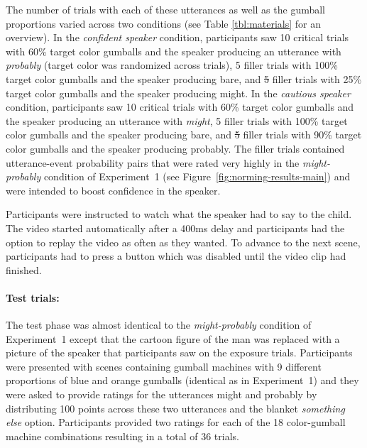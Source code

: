 \documentclass[man, floatsintext]{apa6}
\newcommand{\figref}[1]{Figure~\ref{#1}}
\providecommand{\DIFadd}[1]{{\protect\color{blue}\uwave{#1}}} %
\providecommand{\DIFdel}[1]{{\protect\color{red}\sout{#1}}}                      %
\providecommand{\DIFaddbegin}{} %
\providecommand{\DIFaddend}{} %
\providecommand{\DIFdelbegin}{} %
\providecommand{\DIFdelend}{} %
\newcommand{\DIFscaledelfig}{0.5}
\newlength{\DIFdelgraphicswidth} %
\newlength{\DIFdelgraphicsheight} %
\newcommand{\DIFaddincludegraphics}[2][]{{\color{blue}\fbox{\DIFOincludegraphics[#1]{#2}}}} %
\newcommand{\DIFdelincludegraphics}[2][]{%
\sbox{\DIFdelgraphicsbox}{\DIFOincludegraphics[#1]{#2}}%
\settoboxwidth{\DIFdelgraphicswidth}{\DIFdelgraphicsbox} %
\settoboxtotalheight{\DIFdelgraphicsheight}{\DIFdelgraphicsbox} %
\scalebox{\DIFscaledelfig}{%
\parbox[b]{\DIFdelgraphicswidth}{\usebox{\DIFdelgraphicsbox}\\[-\baselineskip] \rule{\DIFdelgraphicswidth}{0em}}\llap{\resizebox{\DIFdelgraphicswidth}{\DIFdelgraphicsheight}{%
\setlength{\unitlength}{\DIFdelgraphicswidth}%
\begin{picture}(1,1)%
\thicklines\linethickness{2pt} %
{\color[rgb]{1,0,0}\put(0,0){\framebox(1,1){}}}%
{\color[rgb]{1,0,0}\put(0,0){\line( 1,1){1}}}%
{\color[rgb]{1,0,0}\put(0,1){\line(1,-1){1}}}%
\end{picture}%
}\hspace*{3pt}}} %
} %
\DeclareRobustCommand{\DIFaddbegin}{\DIFOaddbegin \let\includegraphics\DIFaddincludegraphics} %
\DeclareRobustCommand{\DIFaddend}{\DIFOaddend \let\includegraphics\DIFOincludegraphics} %
\DeclareRobustCommand{\DIFdelbegin}{\DIFOdelbegin \let\includegraphics\DIFdelincludegraphics} %
\DeclareRobustCommand{\DIFdelend}{\DIFOaddend \let\includegraphics\DIFOincludegraphics} %
\begin{document}
The number of trials with each of these utterances as well as the gumball proportions varied across two conditions (see Table \ref{tbl:materials} for an overview). In the {\it confident speaker} condition, participants saw 10 critical trials with 60\% target color gumballs and the speaker producing an utterance with \emph{probably} (target color was randomized across trials), 5 filler trials with 100\% target color gumballs and the speaker producing {\sc bare}, and \DIFdelbegin \DIFdel{5 }\DIFdelend \DIFaddbegin \DIFadd{10 }\DIFaddend filler trials with 25\% target color gumballs and the speaker producing {\sc might}. In the {\it cautious speaker} condition, participants saw 10 critical trials with 60\% target color gumballs and the speaker producing an utterance with \emph{might}, 5 filler trials with 100\% target color gumballs and the speaker producing {\sc bare}, and \DIFdelbegin \DIFdel{5 }\DIFdelend \DIFaddbegin \DIFadd{10 }\DIFaddend filler trials with 90\% target color gumballs and the speaker producing {\sc probably}. The filler trials contained utterance-event probability pairs that were rated very highly in the \textit{might-probably} condition of Experiment~1 (see \figref{fig:norming-results-main}) and were intended to boost confidence in the speaker.

Participants were instructed to watch what the speaker had to say to the child. The video started automatically after a 400ms delay and participants had the option to replay the video as often as they wanted. To advance to the next scene, participants had to press a button which was disabled until the video clip had finished.

\paragraph{Test trials:} The test phase was almost identical to the  \textit{might-probably} condition of Experiment~1 except that the cartoon figure of the man was replaced with a picture of the speaker that participants saw on the exposure trials. Participants were presented with scenes containing gumball machines with 9 different proportions of blue and orange gumballs  (identical as in Experiment~1) and they were asked to provide ratings for the utterances {\sc might} and {\sc probably} by distributing 100 points across these two utterances and the blanket {\it something else} option. Participants provided two ratings for each of the 18 color-gumball machine combinations resulting in a total of 36 trials. 
\end{document}
